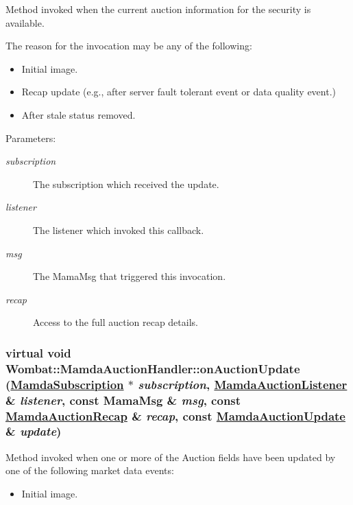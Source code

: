Method invoked when the current auction information for the security is available. 

The reason for the invocation may be any of the following:\begin{itemize}
\item Initial image.\item Recap update (e.g., after server fault tolerant event or data quality event.)\item After stale status removed.\end{itemize}


\begin{Desc}
\item[Parameters:]
\begin{description}
\item[{\em subscription}]The subscription which received the update. \item[{\em listener}]The listener which invoked this callback. \item[{\em msg}]The Mama\-Msg that triggered this invocation. \item[{\em recap}]Access to the full auction recap details. \end{description}
\end{Desc}
\hypertarget{classWombat_1_1MamdaAuctionHandler_5e83ef0df411ddb008dc39cc4a876e54}{
\subsubsection[onAuctionUpdate]{\setlength{\rightskip}{0pt plus 5cm}virtual void Wombat::Mamda\-Auction\-Handler::on\-Auction\-Update (\hyperlink{classWombat_1_1MamdaSubscription}{Mamda\-Subscription} $\ast$ {\em subscription}, \hyperlink{classWombat_1_1MamdaAuctionListener}{Mamda\-Auction\-Listener} \& {\em listener}, const Mama\-Msg \& {\em msg}, const \hyperlink{classWombat_1_1MamdaAuctionRecap}{Mamda\-Auction\-Recap} \& {\em recap}, const \hyperlink{classWombat_1_1MamdaAuctionUpdate}{Mamda\-Auction\-Update} \& {\em update})}}
\label{classWombat_1_1MamdaAuctionHandler_5e83ef0df411ddb008dc39cc4a876e54}


Method invoked when one or more of the Auction fields have been updated by one of the following market data events:\begin{itemize}
\item Initial image. \end{itemize}


